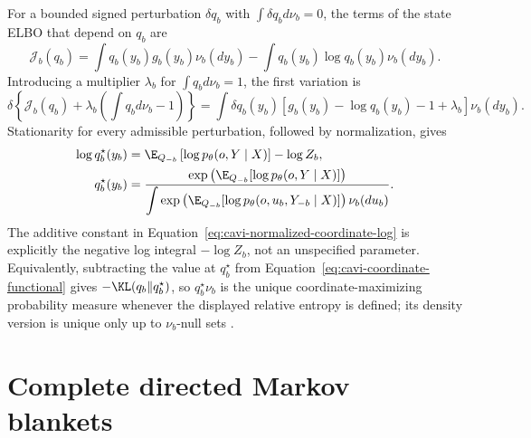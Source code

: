 For a bounded signed perturbation \(\delta q_b\) with \(\int\delta q_b d\nu_b=0\), the terms of the state ELBO that depend on \(q_b\) are
\begin{equation}
\mathcal J_b(q_b)
=\int q_b(y_b)g_b(y_b)\nu_b(dy_b)
-\int q_b(y_b)\log q_b(y_b)\nu_b(dy_b).
\label{eq:cavi-coordinate-functional}
\end{equation}
Introducing a multiplier \(\lambda_b\) for \(\int q_b d\nu_b=1\), the first variation is
\begin{equation}
\delta\left\{\mathcal J_b(q_b)
+\lambda_b\left(\int q_b d\nu_b-1\right)\right\}
=\int\delta q_b(y_b)
\left[g_b(y_b)-\log q_b(y_b)-1+\lambda_b\right]\nu_b(dy_b).
\label{eq:cavi-constrained-first-variation}
\end{equation}
Stationarity for every admissible perturbation, followed by normalization, gives
\begin{align}
\log q_b^\star(y_b)
&=\E_{Q_{-b}}\left[\log p_\theta(o,Y\mid X)\right]-\log Z_b,
\label{eq:cavi-normalized-coordinate-log}\\
q_b^\star(y_b)
&=\frac{\exp\left(\E_{Q_{-b}}[\log p_\theta(o,Y\mid X)]\right)}
{\displaystyle\int
\exp\left(\E_{Q_{-b}}[\log p_\theta(o,u_b,Y_{-b}\mid X)]\right)
\nu_b(du_b)}.
\label{eq:cavi-normalized-coordinate-density}
\end{align}
The additive constant in Equation~\eqref{eq:cavi-normalized-coordinate-log} is explicitly the negative log integral \(-\log Z_b\), not an unspecified parameter. Equivalently, subtracting the value at \(q_b^\star\) from Equation~\eqref{eq:cavi-coordinate-functional} gives \(-\KL(q_b\Vert q_b^\star)\), so \(q_b^\star\nu_b\) is the unique coordinate-maximizing probability measure whenever the displayed relative entropy is defined; its density version is unique only up to \(\nu_b\)-null sets \citep{Bishop2006,Blei2017,Wainwright2008}.

\section{Complete directed Markov blankets}

